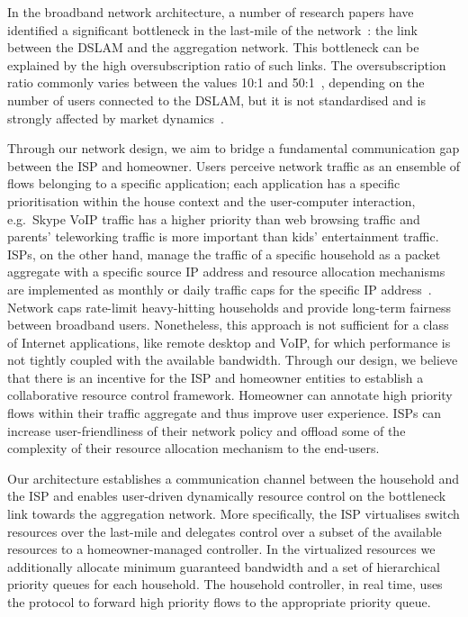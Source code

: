 In the broadband network architecture, a number of research papers have
identified a significant bottleneck in the last-mile of the
network~\cite{Dischinger:2007bg,Akella2003}: the link between the DSLAM and the
aggregation network. This bottleneck can be explained by the high
oversubscription ratio of such links. The oversubscription ratio commonly varies
between the values 10:1 and 50:1~\cite{canada-subscription}, depending on the
number of users connected to the DSLAM, but it is not standardised and is
strongly affected by market dynamics~\cite{sky-oversubscription}.  

Through our network design, we aim to bridge a fundamental communication gap
between the ISP and homeowner. Users perceive network traffic as an ensemble of
flows belonging to a specific application; each application has a specific
prioritisation within the house context and the user-computer interaction,
e.g.~Skype VoIP traffic has a higher priority than web browsing traffic and
parents' teleworking traffic is more important than kids' entertainment traffic.
ISPs, on the other hand, manage the traffic of a specific household as a packet
aggregate with a specific source IP address and resource allocation mechanisms
are implemented as monthly or daily traffic caps for the specific IP
address~\cite{virgin-caps,bt-caps}.  Network caps  rate-limit heavy-hitting
households and provide long-term fairness between broadband users. Nonetheless,
this approach is not sufficient for a class of Internet applications, like
remote desktop and VoIP, for which performance is not tightly coupled with the
available bandwidth. Through our design, we believe that there is an incentive
for the ISP and homeowner entities to establish a
collaborative resource control framework. Homeowner can annotate high priority flows
within their traffic aggregate and thus improve user experience. ISPs can
increase user-friendliness of their network policy and offload some of the
complexity of their resource allocation mechanism to the end-users. 

Our architecture establishes a communication channel between the household and
the ISP and enables user-driven dynamically resource control on the bottleneck
link towards the aggregation network. More specifically, the ISP virtualises
switch resources over the last-mile and delegates control over a subset of the
available resources to a homeowner-managed \of controller.  In the virtualized
resources we additionally allocate minimum guaranteed bandwidth and a set of
hierarchical priority queues for each household. The household controller, in
real time, uses the \of protocol to forward high priority flows to the
appropriate priority queue. 

